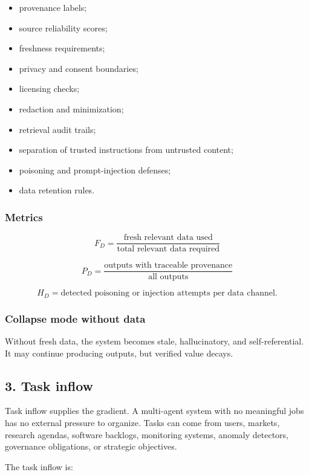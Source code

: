 \documentclass[
  11pt,
]{article}
\providecommand{\tightlist}{%
  \setlength{\itemsep}{0pt}\setlength{\parskip}{0pt}}
\begin{document}
\begin{itemize}
\tightlist
\item
  provenance labels;
\item
  source reliability scores;
\item
  freshness requirements;
\item
  privacy and consent boundaries;
\item
  licensing checks;
\item
  redaction and minimization;
\item
  retrieval audit trails;
\item
  separation of trusted instructions from untrusted content;
\item
  poisoning and prompt-injection defenses;
\item
  data retention rules.
\end{itemize}

\subsubsection{Metrics}\label{metrics-1}

\[
F_D=\frac{\text{fresh relevant data used}}{\text{total relevant data required}}
\]

\[
P_D=\frac{\text{outputs with traceable provenance}}{\text{all outputs}}
\]

\[
H_D=\text{detected poisoning or injection attempts per data channel}.
\]

\subsubsection{Collapse mode without
data}\label{collapse-mode-without-data}

Without fresh data, the system becomes stale, hallucinatory, and
self-referential. It may continue producing outputs, but verified value
decays.

\subsection{3. Task inflow}\label{task-inflow}

Task inflow supplies the gradient. A multi-agent system with no
meaningful jobs has no external pressure to organize. Tasks can come
from users, markets, research agendas, software backlogs, monitoring
systems, anomaly detectors, governance obligations, or strategic
objectives.

The task inflow is:
\end{document}
